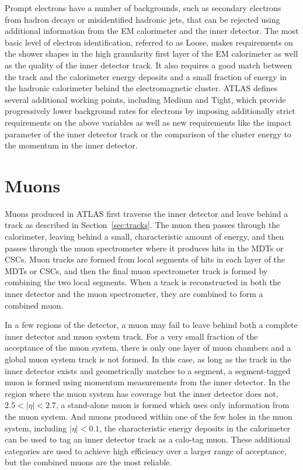 Prompt electrons have a number of backgrounds, such as secondary electrons from hadron decays or misidentified hadronic jets, that can be rejected using additional information from the \ac{EM} calorimeter and the inner detector.
The most basic level of electron identification, referred to as Loose, makes requirements on the shower shapes in the high granularity first layer of the \ac{EM} calorimeter as well as the quality of the inner detector track.
It also requires a good match between the track and the calorimeter energy deposits and a small fraction of energy in the hadronic calorimeter behind the electromagnetic cluster.
\ac{ATLAS} defines several additional working points, including Medium and Tight, which provide progressively lower background rates for electrons by imposing additionally strict requirements on the above variables as well as new requirements like the impact parameter of the inner detector track or the comparison of the cluster energy to the momentum in the inner detector.


\section{Muons}
\label{sec:muons}

Muons produced in \ac{ATLAS} first traverse the inner detector and leave behind a track as described in Section~\ref{sec:tracks}.
The muon then passes through the calorimeter, leaving behind a small, characteristic amount of energy, and then passes through the muon spectrometer where it produces hits in the \acp{MDT} or \acp{CSC}.
Muon tracks are formed from local segments of hits in each layer of the \acp{MDT} or \acp{CSC}, and then the final muon spectrometer track is formed by combining the two local segments.
When a track is reconstructed in both the inner detector and the muon spectrometer, they are combined to form a combined muon.

In a few regions of the detector, a muon may fail to leave behind both a complete inner detector and muon system track.
For a very small fraction of the acceptance of the muon system, there is only one layer of muon chambers and a global muon system track is not formed.
In this case, as long as the track in the inner detector exists and geometrically matches to a segment, a segment-tagged muon is formed using momentum measurements from the inner detector.
In the region where the muon system has coverage but the inner detector does not, $2.5 < |\eta| < 2.7$, a stand-alone muon is formed which uses only information from the muon system.
And muons produced within one of the few holes in the muon system, including $|\eta| < 0.1$, the characteristic energy deposits in the calorimeter can be used to tag an inner detector track as a calo-tag muon.
These additional categories are used to achieve high efficiency over a larger range of acceptance, but the combined muons are the most reliable.

